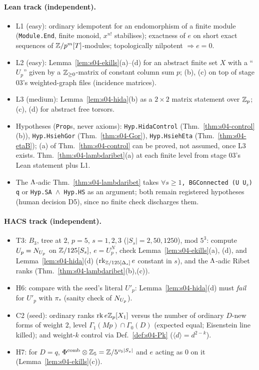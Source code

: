 \paragraph{Lean track (independent).}
\begin{itemize}
\item L1 (easy): ordinary idempotent for an endomorphism of a finite module (\texttt{Module.End}, finite monoid, $x^{n!}$ stabilises);
  exactness of $e$ on short exact sequences of $\mathbb{Z}/p^m[T]$-modules; topologically nilpotent $\Rightarrow e=0$.
\item L2 (easy): Lemma~\ref{lem:s04-ekills}(a)--(d) for an abstract finite set $X$ with a ``$U_p$'' given by a $\mathbb{Z}_{\ge0}$-matrix of
  constant column sum $p$; (b), (c) on top of stage 03's weighted-graph files (incidence matrices).
\item L3 (medium): Lemma~\ref{lem:s04-hida}(b) as a $2\times2$ matrix statement over $\mathbb{Z}_p$; (c), (d) for abstract free torsors.
\item Hypotheses (\texttt{Prop}s, never axioms): \texttt{Hyp.HidaControl} (Thm.~\ref{thm:s04-control}(b)), \texttt{Hyp.HsiehGor}
  (Thm.~\ref{thm:s04-Gor}), \texttt{Hyp.HsiehEta} (Thm.~\ref{thm:s04-etaB}); (a) of Thm.~\ref{thm:s04-control} can be proved, not assumed,
  once L3 exists. Thm.~\ref{thm:s04-lambdaribet}(a) at each finite level from stage 03's Lean statement plus L1.
\item The $\Lambda$-adic Thm.~\ref{thm:s04-lambdaribet} takes \texttt{$\forall s\ge1$, BGConnected (U U$_s$) q} or \texttt{Hyp.SA $\wedge$ Hyp.HS} as an argument; both remain registered hypotheses (human decision D5), since no finite check discharges them.
\end{itemize}

\paragraph{HACS track (independent).}
\begin{itemize}
\item T3: $B_3$, tree at $2$, $p=5$, $s=1,2,3$ ($|S_s|=2,50,1250$), mod $5^3$: compute $U_p=N_{U_p}$ on $\mathbb{Z}/125[S_s]$, $e=U_p^{N}$, check
  Lemma~\ref{lem:s04-ekills}(a), (d), and Lemma~\ref{lem:s04-hida}(d) ($\operatorname{rk}_{\mathbb{Z}/125[\Delta_s]}e$ constant in $s$), and the
  $\Lambda$-adic Ribet ranks (Thm.~\ref{thm:s04-lambdaribet}(b),(c)).
\item H6: compare with the seed's literal $U'_p$: Lemma~\ref{lem:s04-hida}(d) must \emph{fail} for $U'_p$ with $\pi_*$ (sanity check of $N_{U_p}$).
\item C2 (seed): ordinary ranks $\operatorname{rk} e\mathbb{Z}_p[X_1]$ versus the number of ordinary $D$-new forms of weight $2$, level $\Gamma_1(Mp)\cap\Gamma_0(D)$
  (expected equal; Eisenstein line killed); and weight-$k$ control via Def.~\ref{def:s04-Pk} ($\langle d\rangle=d^{2-k}$).
\item H7: for $D=q$, $\Phi^{\mathrm{comb}}\otimes\mathbb{Z}_5=\mathbb{Z}/5^{v_5|S_s|}$ and $e$ acting as $0$ on it (Lemma~\ref{lem:s04-ekills}(c)).
\end{itemize}

